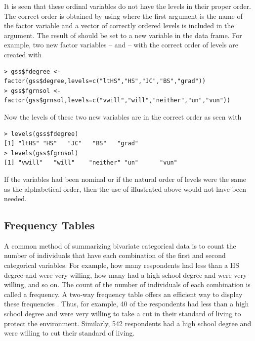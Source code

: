 \documentclass[10pt,openany]{book}\usepackage[]{graphicx}\usepackage[]{color}
\makeatletter
\newenvironment{kframe}{%
 \def\at@end@of@kframe{}%
 \ifinner\ifhmode%
  \def\at@end@of@kframe{\end{minipage}}%
  \begin{minipage}{\columnwidth}%
 \fi\fi%
 \def\FrameCommand##1{\hskip\@totalleftmargin \hskip-\fboxsep
 \colorbox{shadecolor}{##1}\hskip-\fboxsep
     \hskip-\linewidth \hskip-\@totalleftmargin \hskip\columnwidth}%
 \MakeFramed {\advance\hsize-\width
   \@totalleftmargin\z@ \linewidth\hsize
   \@setminipage}}%
 {\par\unskip\endMakeFramed%
 \at@end@of@kframe}
\newenvironment{knitrout}{}{} %
\makeatother
\begin{document}
It is seen that these ordinal variables do not have the levels in their proper order.  The correct order is obtained by using  where the first argument is the name of the factor variable and a vector of correctly ordered levels is included in the  argument.  The result of  should be set to a new variable in the data frame.  For example, two new factor variables --  and  -- with the correct order of levels are created with
\begin{knitrout}
\color{fgcolor}\begin{kframe}
\begin{verbatim}
> gss$fdegree <- factor(gss$degree,levels=c("ltHS","HS","JC","BS","grad"))
> gss$fgrnsol <- factor(gss$grnsol,levels=c("vwill","will","neither","un","vun"))
\end{verbatim}
\end{kframe}
\end{knitrout}
Now the levels of these two new variables are in the correct order as seen with
\begin{knitrout}
\color{fgcolor}\begin{kframe}
\begin{verbatim}
> levels(gss$fdegree)
[1] "ltHS" "HS"   "JC"   "BS"   "grad"
> levels(gss$fgrnsol)
[1] "vwill"   "will"    "neither" "un"      "vun"    
\end{verbatim}
\end{kframe}
\end{knitrout}
If the variables had been nominal or if the natural order of levels were the same as the alphabetical order, then the use of  illustrated above would not have been needed.


\subsection{Frequency Tables}
\vspace{-12pt}

A common method of summarizing bivariate categorical data is to count the number of individuals that have each combination of the first and second categorical variables.  For example, how many respondents had less than a HS degree and were very willing, how many had a high school degree and were very willing, and so on.  The count of the number of individuals of each combination is called a frequency.  A two-way frequency table offers an efficient way to display these frequencies .  Thus, for example, 40 of the respondents had less than a high school degree and were very willing to take a cut in their standard of living to protect the environment.  Similarly, 542 respondents had a high school degree and were willing to cut their standard of living.
\end{document}
